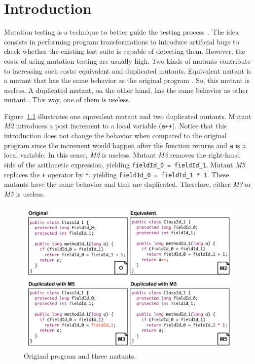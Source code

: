 \chapter{Introduction}
\label{chp:introduction}


Mutation testing is a technique to better guide the testing process~\cite{DEMILLO:1978:1, JIA:2011:1}. The idea consists in performing program transformations to introduce artificial bugs to check whether the existing test suite is capable of detecting them. However, the costs of using mutation testing are usually high. Two kinds of mutants contribute to increasing such costs: equivalent and duplicated mutants. Equivalent mutant is a mutant that has the same behavior as the original program \cite{BUDD:1982:1, JIA:2011:1, MADEYISKI:2014:1}. So, this mutant is useless. A duplicated mutant, on the other hand, has the same behavior as other mutant \cite{PAPADAKIS:2015:1, KINTIS:2017:1}. This way, one of them is useless. 

Figure~\ref{fig:background} illustrates one equivalent mutant and two duplicated mutants. 
Mutant \textit{M2} introduces a post increment to a local variable (\texttt{a++}). 
Notice that this introduction does not change the behavior when compared to the original program since the increment would happen after the function returns and \texttt{a} is a local variable. 
In this sense, \textit{M2} is useless. Mutant \textit{M3} removes the right-hand side of the arithmetic expression, yielding \texttt{fieldId\_0 = fieldId\_1}. 
Mutant \textit{M5} replaces the \texttt{+} operator by \texttt{*}, yielding \texttt{fieldId\_0 = fieldId\_1 * 1}. 
These mutants have the same behavior and thus are duplicated. Therefore, either \textit{M3} or \textit{M5} is useless.

\begin{figure}[h]
\begin{center}
\includegraphics[scale=0.5]{images/Background.pdf}
\caption{Original program and three mutants.}
\label{fig:background}
\end{center}
\end{figure}

